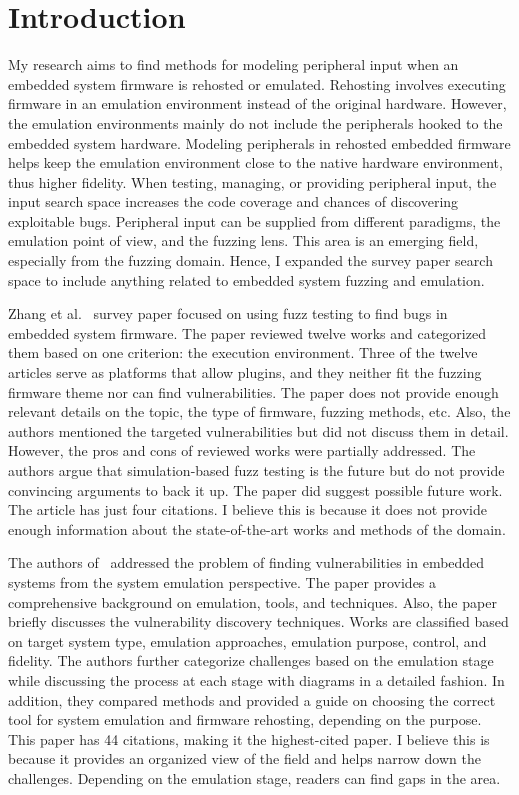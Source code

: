 \section{Introduction} \label{sec-introduction}

My research aims to find methods for modeling peripheral input when an embedded system firmware is rehosted or emulated. Rehosting involves executing firmware in an emulation environment instead of the original hardware. However, the emulation environments mainly do not include the peripherals hooked to the embedded system hardware. Modeling peripherals in rehosted embedded firmware helps keep the emulation environment close to the native hardware environment, thus higher fidelity. When testing, managing, or providing peripheral input, the input search space increases the code coverage and chances of discovering exploitable bugs. Peripheral input can be supplied from different paradigms, the emulation point of view, and the fuzzing lens. This area is an emerging field, especially from the fuzzing domain. Hence, I expanded the survey paper search space to include anything related to embedded system fuzzing and emulation.

Zhang et al.~\cite{zhang_firmware_2020} survey paper focused on using fuzz testing to find bugs in embedded system firmware. The paper reviewed twelve works and categorized them based on one criterion: the execution environment. Three of the twelve articles serve as platforms that allow plugins, and they neither fit the fuzzing firmware theme nor can find vulnerabilities. The paper does not provide enough relevant details on the topic, the type of firmware, fuzzing methods, etc. Also, the authors mentioned the targeted vulnerabilities but did not discuss them in detail. However, the pros and cons of reviewed works were partially addressed. The authors argue that simulation-based fuzz testing is the future but do not provide convincing arguments to back it up. The paper did suggest possible future work. The article has just four citations. I believe this is because it does not provide enough information about the state-of-the-art works and methods of the domain.


The authors of~\cite{wright_challenges_2022} addressed the problem of finding vulnerabilities in embedded systems from the system emulation perspective. The paper provides a comprehensive background on emulation, tools, and techniques. Also, the paper briefly discusses the vulnerability discovery techniques. Works are classified based on target system type, emulation approaches, emulation purpose, control, and fidelity. The authors further categorize challenges based on the emulation stage while discussing the process at each stage with diagrams in a detailed fashion. In addition, they compared methods and provided a guide on choosing the correct tool for system emulation and firmware rehosting, depending on the purpose. This paper has 44 citations, making it the highest-cited paper. I believe this is because it provides an organized view of the field and helps narrow down the challenges. Depending on the emulation stage, readers can find gaps in the area.



